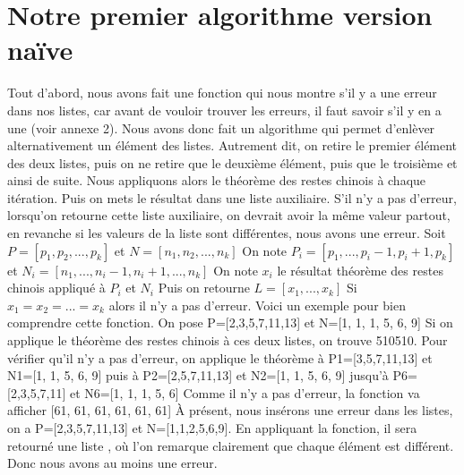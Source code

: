 \documentclass[a4paper, 11pt]{report}
\begin{document}
\section{Notre premier algorithme version naïve }
Tout d'abord, nous avons fait une fonction qui nous montre s'il y a une erreur dans nos listes, car avant de vouloir trouver les erreurs, il faut savoir s'il y en a une (voir annexe 2).
Nous avons donc fait un algorithme qui permet d'enlèver alternativement un élément des listes. Autrement dit, on retire le premier élément des deux listes, puis on ne retire que le deuxième élément, puis que le troisième et ainsi de suite. Nous appliquons alors le théorème des restes chinois à chaque itération. Puis on mets le résultat dans une liste auxiliaire. S'il n'y a pas d'erreur,
lorsqu'on retourne cette liste auxiliaire, on devrait avoir la même valeur partout, en revanche si les valeurs de la liste sont différentes, nous avons une erreur. \newline
\newline
Soit $P=[p_1 , p_2, ... , p_k]$ et $N=[n_1, n_2, ..., n_k]$ \newline
On note $P_i = [p_1,..., p_i-1, p_i+1, p_k]$ et $N_i=[n_1,..., n_i-1, n_i+1, ... , n_k]$ \newline
On note $x_i$ le résultat théorème des restes chinois appliqué à $P_i$ et $N_i$ \newline
Puis on retourne 
$L=[x_1, ..., x_k]$ \newline
Si 
$x_1=x_2=...=x_k$ 
alors il n'y a pas d'erreur. \newline
\newline
Voici un exemple pour bien comprendre cette fonction.\newline
On pose P=[2,3,5,7,11,13] et N=[1, 1, 1, 5, 6, 9] \newline
Si on applique le théorème des restes chinois à ces deux listes, on trouve 510510. Pour vérifier qu'il n'y a pas d'erreur, on applique le théorème à
P1=[3,5,7,11,13] et N1=[1, 1, 5, 6, 9] puis à \newline P2=[2,5,7,11,13] et N2=[1, 1, 5, 6, 9] jusqu'à P6=[2,3,5,7,11] et N6=[1, 1, 1, 5, 6]\newline
Comme il n'y a pas d'erreur, la fonction va afficher [61, 61, 61, 61, 61, 61] \newline
À présent, nous insérons une erreur dans les listes, on a P=[2,3,5,7,11,13] et N=[1,1,2,5,6,9]. En appliquant la fonction, il sera retourné une liste \newline [6067, 6067, 61, 1777, 607, 1447], où l'on remarque clairement que chaque élément est différent. Donc nous avons au moins une erreur.
\end{document}
